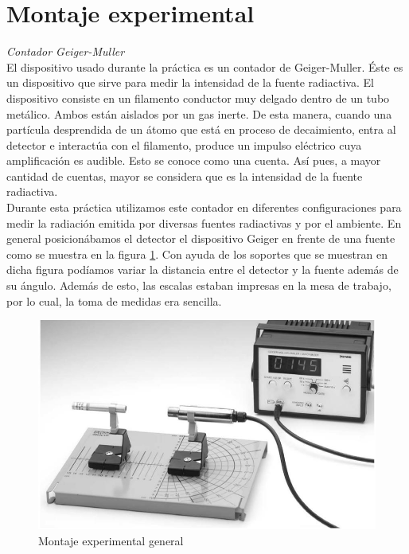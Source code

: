 \documentclass[%
 reprint,
 amsmath,amssymb,
 aps,
]{revtex4-1}
\begin{document}
\section{\label{sec:level1}Montaje experimental}
\textit{Contador Geiger-Muller}\\
El dispositivo usado durante la práctica es un contador de Geiger-Muller. Éste es un dispositivo que sirve para medir la intensidad de la fuente radiactiva. El dispositivo consiste en un filamento conductor muy delgado dentro de un tubo metálico. Ambos están aislados por un gas inerte. De esta manera, cuando una partícula desprendida de un átomo que está en proceso de decaimiento, entra al detector e interactúa con el filamento, produce un impulso eléctrico cuya amplificación es audible. Esto se conoce como una cuenta. Así pues, a mayor cantidad de cuentas, mayor se considera que es la intensidad de la fuente radiactiva.\\

Durante esta práctica utilizamos este contador en diferentes configuraciones para medir la radiación emitida por diversas fuentes radiactivas y por el ambiente. En general posicionábamos el detector el dispositivo Geiger en frente de una fuente como se muestra en la figura \ref{fig:montaje}. Con ayuda de los soportes que se muestran en dicha figura podíamos variar la distancia entre el detector y la fuente además de su ángulo. Además de esto, las escalas estaban impresas en la mesa de trabajo, por lo cual, la toma de medidas era sencilla.\\

\begin{figure}[h!]
\centering
\includegraphics[width=1\linewidth]{montaje.jpg}
\caption{Montaje experimental general}
\label{fig:montaje}
\end{figure}
\end{document}
